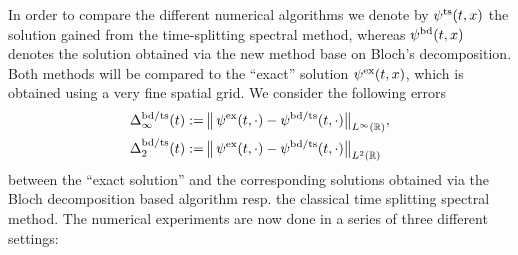 \documentclass[leqno,final]{siamltex}
\numberwithin{equation}{section}
\newcounter{me}
\begin{document}
In order to compare the different numerical algorithms we denote
by $\psi^{\rm ts}(t,x)$ the solution gained from the
time-splitting spectral method, whereas $\psi^{\rm bd}(t,x)$
denotes the solution obtained via the new method base on Bloch's
decomposition. Both methods will be compared to the ``exact''
solution $\psi^{\rm ex}(t,x)$, which is obtained using a very fine
spatial grid. We consider the following errors \begin{equation}\label{error1}
\begin{aligned}
\Delta^{\rm bd/ts}_\infty(t):= & \,
{\big \| \, \psi^{\rm ex}(t,\cdot) - \psi^{\rm bd/ts}(t,\cdot)
\big \|}_{L^\infty({{\mathbb R}})},\\
\Delta^{\rm bd/ts}_2(t):= &\, {\big \| \, \psi^{\rm ex}(t,\cdot) -
\psi^{\rm bd/ts}(t,\cdot) \big \|}_{L^2({{\mathbb R}})}
\end{aligned}
\end{equation} between the ``exact solution'' and the corresponding solutions
obtained via the Bloch decomposition based algorithm resp. the
classical time splitting spectral method. The numerical
experiments are now done in a series of three different settings:
\end{document}
